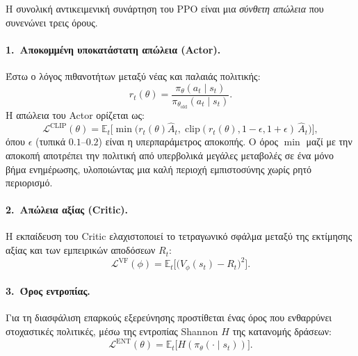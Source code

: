 Η συνολική αντικειμενική συνάρτηση του PPO είναι μια \emph{σύνθετη απώλεια}
που συνενώνει τρεις όρους.

\paragraph{1.\ Αποκομμένη υποκατάστατη απώλεια (Actor).}
Έστω ο λόγος πιθανοτήτων μεταξύ νέας και παλαιάς πολιτικής:
\begin{equation}
    r_t(\theta) = \frac{\pi_{\theta}(a_t \mid s_t)}
    {\pi_{\theta_{\mathrm{old}}}(a_t \mid s_t)}.
    \label{eq:ppo-ratio}
\end{equation}
Η απώλεια του Actor ορίζεται ως:
\begin{equation}
    \mathcal{L}^{\mathrm{CLIP}}(\theta) = \mathbb{E}_t\!\Big[
    \min\big( r_t(\theta)\hat{A}_t,\;
    \mathrm{clip}(r_t(\theta), 1-\epsilon, 1+\epsilon)\,\hat{A}_t \big)
    \Big],
    \label{eq:ppo-clip}
\end{equation}
όπου $\epsilon$ (τυπικά $0.1$--$0.2$) είναι η υπερπαράμετρος αποκοπής. Ο όρος
$\min$ μαζί με την αποκοπή αποτρέπει την πολιτική από υπερβολικά μεγάλες
μεταβολές σε ένα μόνο βήμα ενημέρωσης, υλοποιώντας μια καλή περιοχή
εμπιστοσύνης χωρίς ρητό περιορισμό.

\paragraph{2.\ Απώλεια αξίας (Critic).}
Η εκπαίδευση του Critic ελαχιστοποιεί το τετραγωνικό σφάλμα μεταξύ της εκτίμησης
αξίας και των εμπειρικών αποδόσεων $R_t$:
\begin{equation}
    \mathcal{L}^{\mathrm{VF}}(\phi) = \mathbb{E}_t\!\Big[
    \big( V_{\phi}(s_t) - R_t \big)^2 \Big].
    \label{eq:ppo-vf}
\end{equation}

\paragraph{3.\ Όρος εντροπίας.}
Για τη διασφάλιση επαρκούς εξερεύνησης προστίθεται ένας όρος που ενθαρρύνει
στοχαστικές πολιτικές, μέσω της εντροπίας Shannon
$H$ της κατανομής δράσεων:
\begin{equation}
    \mathcal{L}^{\mathrm{ENT}}(\theta) = \mathbb{E}_t\!\big[
    H\!\left(\pi_{\theta}(\cdot \mid s_t)\right) \big].
    \label{eq:ppo-ent}
\end{equation}

